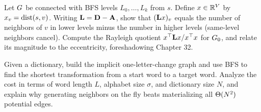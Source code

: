 \begin{exercise}
Let $G$ be connected with BFS levels $L_0,\dots,L_k$ from $s$. Define
$x\in\mathbb{R}^V$ by $x_v=\operatorname{dist}(s,v)$. Writing $\mathbf{L}=\mathbf{D}-\mathbf{A}$, show that
$(\mathbf{L} x)_v$ equals the number of neighbors of $v$ in lower levels minus the
number in higher levels (same-level neighbors cancel). Compute the Rayleigh
quotient $x^\top \mathbf{L} x / x^\top x$ for $G_0$, and relate its magnitude to the
eccentricity, foreshadowing Chapter 32.
\end{exercise}

\begin{exercise}
Given a dictionary, build the implicit one-letter-change graph and use BFS to find
the shortest transformation from a start word to a target word. Analyze the cost
in terms of word length $L$, alphabet size $\sigma$, and dictionary size $N$, and
explain why generating neighbors on the fly beats materializing all $\Theta(N^2)$
potential edges.
\end{exercise}
